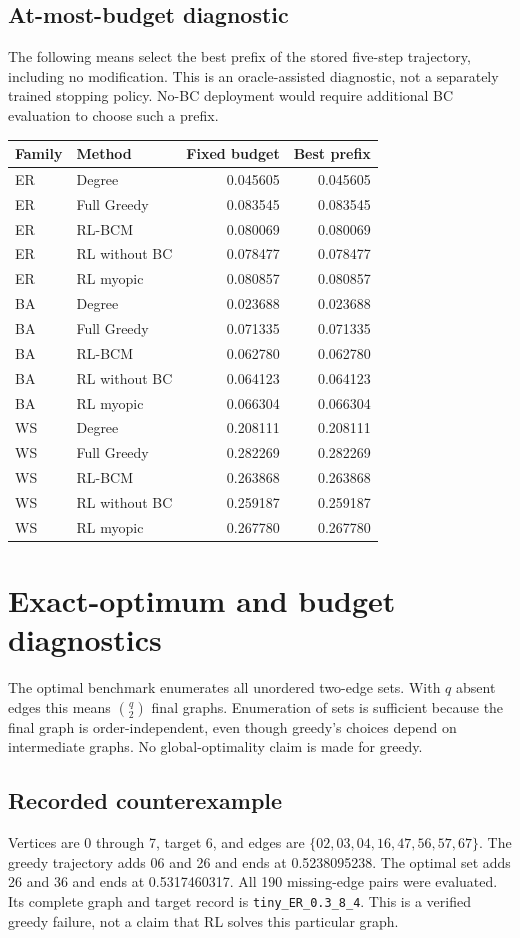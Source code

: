 \documentclass[11pt]{article}
\begin{document}
\subsection{At-most-budget diagnostic}
The following means select the best prefix of the stored five-step trajectory, including no modification. This is an oracle-assisted diagnostic, not a separately trained stopping policy. No-BC deployment would require additional BC evaluation to choose such a prefix.
\begin{longtable}{llrr}
\toprule Family & Method & Fixed budget & Best prefix\\ \midrule\endhead
ER & Degree & 0.045605 & 0.045605\\
ER & Full Greedy & 0.083545 & 0.083545\\
ER & RL-BCM & 0.080069 & 0.080069\\
ER & RL without BC & 0.078477 & 0.078477\\
ER & RL myopic & 0.080857 & 0.080857\\
BA & Degree & 0.023688 & 0.023688\\
BA & Full Greedy & 0.071335 & 0.071335\\
BA & RL-BCM & 0.062780 & 0.062780\\
BA & RL without BC & 0.064123 & 0.064123\\
BA & RL myopic & 0.066304 & 0.066304\\
WS & Degree & 0.208111 & 0.208111\\
WS & Full Greedy & 0.282269 & 0.282269\\
WS & RL-BCM & 0.263868 & 0.263868\\
WS & RL without BC & 0.259187 & 0.259187\\
WS & RL myopic & 0.267780 & 0.267780\\
\bottomrule\end{longtable}
\section{Exact-optimum and budget diagnostics}

The optimal benchmark enumerates all unordered two-edge sets. With $q$ absent
edges this means $\binom{q}{2}$ final graphs. Enumeration of sets is sufficient
because the final graph is order-independent, even though greedy's choices
depend on intermediate graphs. No global-optimality claim is made for greedy.

\subsection{Recorded counterexample}
Vertices are 0 through 7, target 6, and edges are
$\{02,03,04,16,47,56,57,67\}$. The greedy trajectory adds 06 and 26 and ends
at 0.5238095238. The optimal set adds 26 and 36 and ends at 0.5317460317.
All 190 missing-edge pairs were evaluated. Its complete graph and target record
is \texttt{tiny\_ER\_0.3\_8\_4}. This is a verified greedy failure, not a
claim that RL solves this particular graph.
\end{document}
